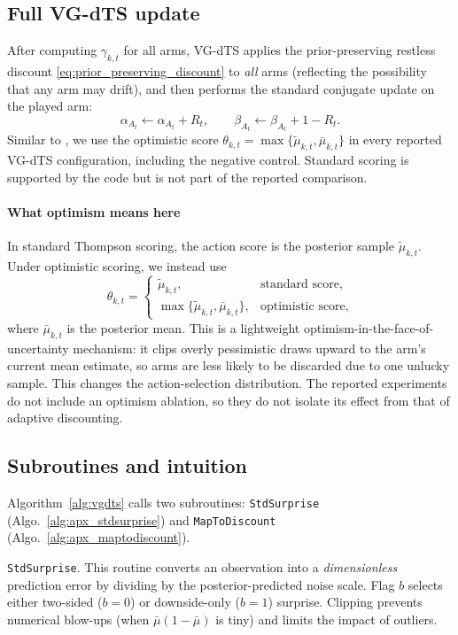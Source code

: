 \documentclass{article}
\begin{document}
\subsection{Full VG-dTS update}
After computing $\gamma_{k,t}$ for all arms, VG-dTS applies the prior-preserving restless discount \eqref{eq:prior_preserving_discount} to \emph{all} arms (reflecting the possibility that any arm may drift), and then performs the standard conjugate update on the played arm:
\begin{equation}
\alpha_{A_t}\leftarrow \alpha_{A_t}+R_t,\qquad
\beta_{A_t}\leftarrow \beta_{A_t}+1-R_t.
\label{eq:conjugate_update_main}
\end{equation}
Similar to \cite{raj2017taming}, we use the optimistic score $\theta_{k,t}=\max\{\widetilde{\mu}_{k,t},\bar{\mu}_{k,t}\}$ in every reported VG-dTS configuration, including the negative control. Standard scoring is supported by the code but is not part of the reported comparison.
\paragraph{What optimism means here}
In standard Thompson scoring, the action score is the posterior sample $\widetilde{\mu}_{k,t}$.
Under optimistic scoring, we instead use
\[
\theta_{k,t}=
\begin{cases}
\widetilde{\mu}_{k,t}, & \text{standard score},\\
\max\{\widetilde{\mu}_{k,t},\bar{\mu}_{k,t}\}, & \text{optimistic score},
\end{cases}
\]
where $\bar{\mu}_{k,t}$ is the posterior mean.
This is a lightweight optimism-in-the-face-of-uncertainty mechanism: it clips overly pessimistic draws upward to the arm's current mean estimate, so arms are less likely to be discarded due to one unlucky sample.
This changes the action-selection distribution. The reported experiments do not include an optimism ablation, so they do not isolate its effect from that of adaptive discounting.

\subsection{Subroutines and intuition}
Algorithm~\ref{alg:vgdts} calls two subroutines:
\texttt{StdSurprise} (Algo.~\ref{alg:apx_stdsurprise}) and \texttt{MapToDiscount} (Algo.~\ref{alg:apx_maptodiscount}).

\texttt{StdSurprise}.
This routine converts an observation into a \emph{dimensionless} prediction error by dividing by the posterior-predicted noise scale.
Flag $b$ selects either two-sided ($b=0$) or downside-only ($b=1$) surprise.
Clipping prevents numerical blow-ups (when $\bar{\mu}(1-\bar{\mu})$ is tiny) and limits the impact of outliers.
\end{document}
